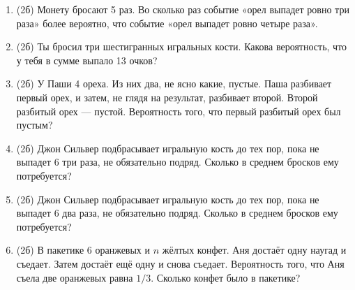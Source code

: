 \documentclass[a4paper, 12pt]{article}
\begin{document}
\begin{enumerate}
\item (2б) Монету бросают 5 раз. Во сколько раз событие «орел выпадет ровно три раза» более вероятно, что событие «орел выпадет ровно четыре раза». 
\item (2б) Ты бросил три шестигранных игральных кости. Какова вероятность, что у тебя в сумме выпало 13 очков? 
\item (2б) У Паши 4 ореха. Из них два, не ясно какие, пустые. Паша разбивает первый орех, и затем, не глядя на результат, разбивает второй. Второй разбитый орех — пустой. Вероятность того, что первый разбитый орех был пустым?

\item (2б) Джон Сильвер подбрасывает игральную кость до тех пор, пока не выпадет 6 три раза, не обязательно подряд. Сколько в среднем бросков ему потребуется?
\item (2б) Джон Сильвер подбрасывает игральную кость до тех пор, пока не выпадет 6 два раза, не обязательно подряд. Сколько в среднем бросков ему потребуется?

\item (2б) В пакетике 6 оранжевых и $n$ жёлтых конфет. Аня достаёт одну наугад и съедает. Затем достаёт ещё одну и снова съедает. Вероятность того, что Аня съела две оранжевых равна $1/3$. Сколько конфет было в пакетике?




\end{enumerate}
\end{document}
